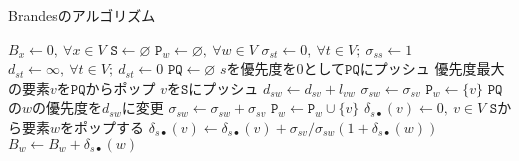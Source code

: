 \begin{algorithm}[H]
  \caption{Brandesのアルゴリズム}
  \label{alg:brandes}
  \begin{multicols*}{2}
    \begin{algorithmic}[1]\small
      \State $B_x\gets 0,\:\forall x\in V$
      \State $\texttt{S}\gets\varnothing$
      \State $\texttt{P}_w\gets\varnothing,\:\forall w\in V$
      \State $\sigma_{st}\gets 0,\:\forall t\in V;\:\sigma_{ss}\gets 1$
      \State $d_{st}\gets\infty,\:\forall t\in V;\:d_{st}\gets 0$
      \State $\texttt{PQ}\gets\varnothing$
      \State $s$を優先度を$0$として$\texttt{PQ}$にプッシュ
      \State 優先度最大の要素$v$を$\texttt{PQ}$からポップ
      \State $v$を$\texttt{S}$にプッシュ
      \State $d_{sw}\gets d_{sv}+l_{vw}$
      \State $\sigma_{sw}\gets\sigma_{sv}$
      \State $\texttt{P}_w\gets\{v\}$
      \State $\texttt{PQ}$の$w$の優先度を$d_{sw}$に変更
      \EndIf
      \State $\sigma_{sw}\gets\sigma_{sw}+\sigma_{sv}$
      \State $\texttt{P}_w\gets\texttt{P}_w\cup\{v\}$
      \EndIf
      \EndFor
      \EndWhile
      \State $\delta_{s\bullet}(v)\gets 0,\:v\in V$
      \State $\texttt{S}$から要素$w$をポップする
      \State $\delta_{s\bullet}(v)\gets\delta_{s\bullet}(v)+\sigma_{sv}/\sigma_{sw}(1+\delta_{s\bullet}(w))$
      \EndFor
      \State $B_w\gets B_w+\delta_{s\bullet}(w)$
      \EndIf
      \EndWhile
      \EndFor
      \EndProcedure
    \end{algorithmic}
  \end{multicols*}
\end{algorithm}

